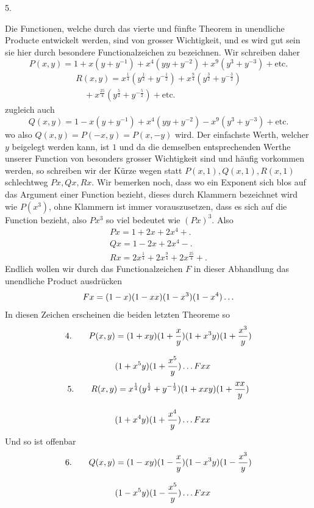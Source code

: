 \par\medskip{}\centerline{5.}\nobreak\smallskip
Die Functionen, welche durch das vierte und fünfte Theorem in unendliche Producte entwickelt werden, sind von grosser Wichtigkeit, und es wird gut sein sie hier durch besondere Functionalzeichen zu bezeichnen. Wir schreiben daher
\[
P(x,y)=1+x(y+y^{-1})+x^4(yy+y^{-2})+x^9(y^3+y^{-3})+\text{etc.}
\]
\[
\begin{gathered}R(x,y)=x^{\frac14}(y^{\frac12}+y^{-\frac12})+x^{\frac94}(y^{\frac32}+y^{-\frac32})\\[8pt]\quad{}+x^{\frac{25}4}(y^{\frac52}+y^{-\frac52})+\text{etc.}\end{gathered}
\]
zugleich auch
\[
Q(x,y)=1-x(y+y^{-1})+x^4(yy+y^{-2})-x^9(y^3+y^{-3})+\text{etc.}
\]
wo also $Q(x,y)=P(-x,y)=P(x,-y)$ wird. Der einfachste Werth, welcher $y$ beigelegt werden kann, ist $1$ und da die demselben entsprechenden Werthe unserer Function von besonders grosser Wichtigkeit sind und häufig vorkommen werden, so schreiben wir der Kürze wegen statt $P(x,1),Q(x,1),R(x,1)$ schlechtweg $Px,Qx,Rx$. Wir bemerken noch, dass wo ein Exponent sich blos auf das Argument einer Function bezieht, dieses durch Klammern bezeichnet wird wie $P(x^3)$, ohne Klammern ist immer vorauszusetzen, dass es sich auf die Function bezieht, also $Px^3$ so viel bedeutet wie $(Px)^3$. Also
\[
\begin{gathered}
Px=1+2x+2x^4+\mathord{.}\\[8pt]
Qx=1-2x+2x^4-\mathord{.}\\[8pt]
Rx=2x^{\frac14}+2x^{\frac94}+2x^{\frac{25}4}+\mathord{.}
\end{gathered}
\]
Endlich wollen wir durch das Functionalzeichen $F$ in dieser Abhandlung das unendliche Product ausdrücken
\[
Fx=(1-x)(1-xx)(1-x^3)(1-x^4)\mathinner{.\,.\,.}
\]
In diesen Zeichen erscheinen die beiden letzten Theoreme so
\[
\begin{gathered}\text{4.}\qquad P(x,y)=(1+xy)(1+\frac xy)(1+x^3y)(1+\frac{x^3}y)\\[8pt]\quad{}(1+x^5y)(1+\frac{x^5}y)\mathinner{.\,.\,.} Fxx\end{gathered}
\]
\[
\begin{gathered}\text{5.}\qquad R(x,y)=x^{\frac14}(y^{\frac12}+y^{-\frac12})(1+xxy)(1+\frac{xx}y)\\[8pt]\quad{}(1+x^4y)(1+\frac{x^4}y)\mathinner{.\,.\,.} Fxx\end{gathered}
\]
Und so ist offenbar
\[
\begin{gathered}\text{6.}\qquad Q(x,y)=(1-xy)(1-\frac xy)(1-x^3y)(1-\frac{x^3}y)\\[8pt]\quad{}(1-x^5y)(1-\frac{x^5}y)\mathinner{.\,.\,.} Fxx\end{gathered}
\]





